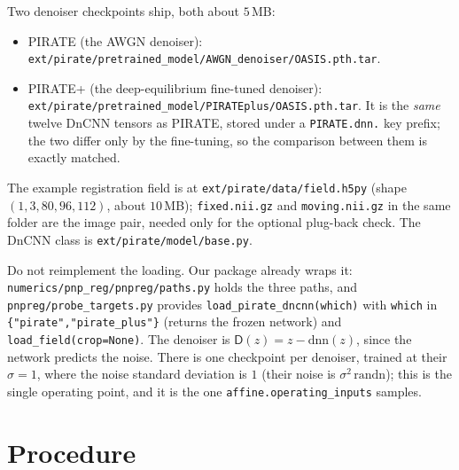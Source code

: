 \documentclass[11pt]{article}
\newcommand{\D}{\mathsf{D}}
\newcommand{\code}[1]{\texttt{#1}}
\begin{document}
Two denoiser checkpoints ship, both about $5$\,MB:
\begin{itemize}
\item PIRATE (the AWGN denoiser): \code{ext/pirate/pretrained\_model/AWGN\_denoiser/OASIS.pth.tar}.
\item PIRATE+ (the deep-equilibrium fine-tuned denoiser): \code{ext/pirate/pretrained\_model/PIRATEplus/OASIS.pth.tar}. It is the \emph{same} twelve DnCNN tensors as PIRATE, stored under a \code{PIRATE.dnn.} key prefix; the two differ only by the fine-tuning, so the comparison between them is exactly matched.
\end{itemize}

The example registration field is at \code{ext/pirate/data/field.h5py} (shape $(1,3,80,96,112)$, about $10$\,MB); \code{fixed.nii.gz} and \code{moving.nii.gz} in the same folder are the image pair, needed only for the optional plug-back check. The DnCNN class is \code{ext/pirate/model/base.py}.

Do not reimplement the loading. Our package already wraps it: \code{numerics/pnp\_reg/pnpreg/paths.py} holds the three paths, and \code{pnpreg/probe\_targets.py} provides \code{load\_pirate\_dncnn(which)} with \code{which} in \code{\{"pirate","pirate\_plus"\}} (returns the frozen network) and \code{load\_field(crop=None)}. The denoiser is $\D(z) = z - \mathrm{dnn}(z)$, since the network predicts the noise. There is one checkpoint per denoiser, trained at their $\sigma = 1$, where the noise standard deviation is $1$ (their noise is $\sigma^2\,\mathrm{randn}$); this is the single operating point, and it is the one \code{affine.operating\_inputs} samples.

\section{Procedure}
\end{document}
